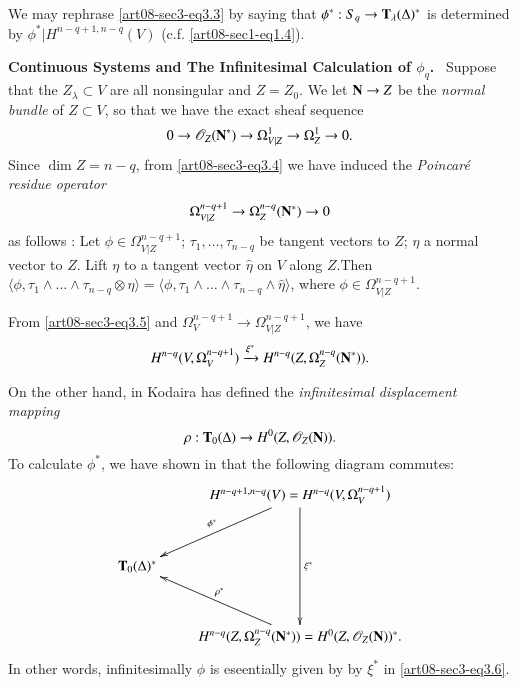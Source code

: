 We may rephrase \eqref{art08-sec3-eq3.3} by saying that $\phi^{*}:S_{q}\to \mathbf{T}_{\lambda}(\Delta)^{*}$ is determined by $\phi^{*}|H^{n-q+1,n-q}(V)$ (c.f. \eqref{art08-sec1-eq1.4}).

\medskip
\noindent
{\bf Continuous Systems and The Infinitesimal Calculation of {\boldmath$\phi_{q}$.}}~ Suppose that the $Z_{\lambda}\subset V$ are all nonsingular and $Z=Z_{0}$. We let $\mathbf{N}\to Z$ be the {\em normal bundle} of $Z\subset V$, so that we have the exact sheaf sequence
\begin{equation}
0\to \mathscr{O}_{Z}(\mathbf{N}^{*})\to \Omega^{1}_{V|Z}\to \Omega^{1}_{Z}\to 0.\label{art08-sec3-eq3.4}
\end{equation}
Since $\dim Z=n-q$, from \eqref{art08-sec3-eq3.4} we have induced the {\em Poincar\'e residue operator}
\begin{equation}
\Omega^{n-q+1}_{V|Z}\to \Omega^{n-q}_{Z}(\mathbf{N}^{*})\to 0\label{art08-sec3-eq3.5}
\end{equation}
as follows : Let $\phi\in \Omega^{n-q+1}_{V|Z}$; $\tau_{1},\ldots,\tau_{n-q}$ be tangent vectors to $Z$; $\eta$ a normal vector to $Z$. Lift $\eta$ to a tangent vector $\widehat{\eta}$ on $V$ along $Z$.\pageoriginale Then $\langle \phi, \tau_{1}\wedge\ldots\wedge \tau_{n-q}\otimes \eta\rangle=\langle \phi,\tau_{1}\wedge\ldots\wedge \tau_{n-q}\wedge\widehat{\eta}\rangle$, where $\phi\in \Omega^{n-q+1}_{V|Z}$.

From \eqref{art08-sec3-eq3.5} and $\Omega^{n-q+1}_{V}\to \Omega^{n-q+1}_{V|Z}$, we have
\begin{equation}
H^{n-q}(V,\Omega^{n-q+1}_{V})\xrightarrow{\xi^{*}}H^{n-q}(Z,\Omega^{n-q}_{Z}(\mathbf{N}^{*})).\label{art08-sec3-eq3.6}
\end{equation}

On the other hand, in \cite{art08-key16} Kodaira has defined the {\em infinitesimal displacement mapping}
\begin{equation}
\rho : \mathbf{T}_{0}(\Delta)\to H^{0}(Z,\mathscr{O}_{Z}(\mathbf{N})).\label{art08-sec3-eq3.7}
\end{equation}
To calculate $\phi^{*}$, we have shown in \cite{art08-key9} that the following diagram commutes:
\begin{equation}
\vcenter{\xymatrix@R=1.2cm{
 & H^{n-q+1,n-q}(V)=H^{n-q}(V,\Omega^{n-q+1}_{V})\ar[dd]^-{\xi^{*}}\ar[dl]_-{\phi^{*}}\\
\bfT_{0}(\Delta)^{*} & \\
& H^{n-q}(Z,\Omega^{n-q}_{Z}(\bfN^{*}))=H^{0}(Z,\mathscr{O}_{Z}(\bfN))^{*}.\ar[ul]_-{\rho^{*}}
}}\label{art08-sec3-eq3.8}
\end{equation}
In other words, infinitesimally $\phi$ is eseentially given by by $\xi^{*}$ in \eqref{art08-sec3-eq3.6}.

